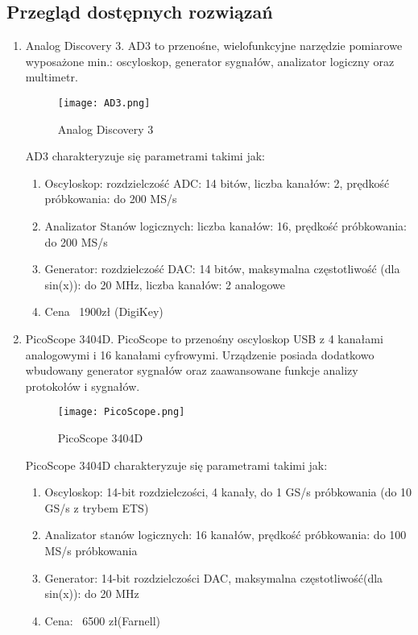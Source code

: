 \subsection{Przegląd dostępnych rozwiązań}
    \begin{enumerate}
        \item Analog Discovery 3.
        \newline AD3 to przenośne, wielofunkcyjne narzędzie pomiarowe wyposażone min.:
        oscyloskop, generator sygnałów, analizator logiczny oraz multimetr.
        \begin{figure}[H]
        \centering
        \texttt{[image: AD3.png]}
        \caption{Analog Discovery 3}
        \label{fig:AD3}
    \end{figure}

    AD3 charakteryzuje się parametrami takimi jak:
    \begin{enumerate}[label=\arabic*.]
        \item Oscyloskop: rozdzielczość ADC: 14 bitów, liczba kanałów: 2, prędkość próbkowania: do 200 MS/s
        \item Analizator Stanów logicznych: liczba kanałów: 16, prędkość próbkowania: do 200 MS/s
        \item Generator: rozdzielczość DAC: 14 bitów, maksymalna częstotliwość (dla sin(x)): do 20 MHz, 
        liczba kanałów: 2 analogowe
        \item Cena ~1900zł (DigiKey)
    \end{enumerate}

    \item PicoScope 3404D. 
    \newline PicoScope to przenośny oscyloskop USB z 4 kanałami analogowymi i
    16 kanałami cyfrowymi. Urządzenie posiada dodatkowo wbudowany generator
    sygnałów oraz zaawansowane funkcje analizy protokołów i sygnałów.
        \begin{figure}[H]
        \centering
        \texttt{[image: PicoScope.png]}
        \caption{PicoScope 3404D}
        \label{fig:PicoScope}
    \end{figure}

    PicoScope 3404D charakteryzuje się parametrami takimi jak:
    \begin{enumerate}[label=\arabic*.]
        \item Oscyloskop: 14-bit rozdzielczości, 4 kanały, do 1 GS/s próbkowania (do 10 GS/s z trybem ETS)
        \item Analizator stanów logicznych: 16 kanałów, prędkość próbkowania: do 100 MS/s próbkowania
        \item Generator: 14-bit rozdzielczości DAC, maksymalna częstotliwość(dla sin(x)): do 20 MHz 
        \item Cena: ~6500 zł(Farnell)
    \end{enumerate}

    \end{enumerate}



